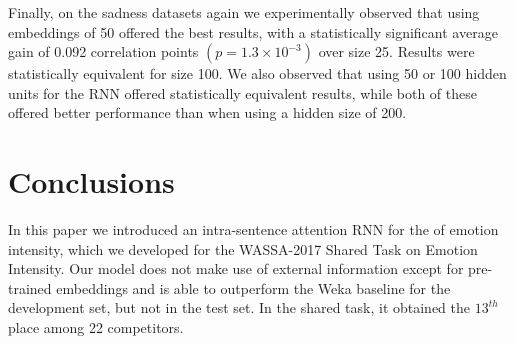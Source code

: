\documentclass[11pt,letterpaper]{article}
\begin{document}
Finally, on the sadness datasets again we experimentally observed that using embeddings of 50 offered the best results, with a statistically significant average gain of 0.092 correlation points  $(p = 1.3 \times 10^{-3})$ over size 25. Results were statistically equivalent for size 100.  We also observed that using 50 or 100 hidden units for the RNN offered statistically equivalent results, while both of these offered better performance than when using a hidden size of 200.


\section{Conclusions}

In this paper we introduced an intra-sentence attention RNN for the of emotion intensity, which we developed for the WASSA-2017 Shared Task on Emotion Intensity. Our model does not make use of external information except for pre-trained embeddings and is able to outperform the Weka baseline for the development set, but not in the test set. In the shared task, it obtained the $13^{th}$ place among 22 competitors. 



\end{document}
